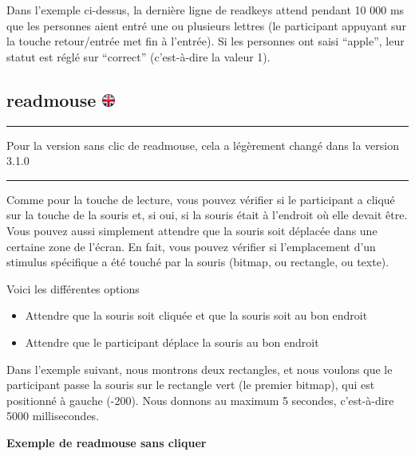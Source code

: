 \documentclass[
]{book}
\providecommand{\tightlist}{%
  \setlength{\itemsep}{0pt}\setlength{\parskip}{0pt}}
\begin{document}
Dans l'exemple ci-dessus, la dernière ligne de readkeys attend pendant
10 000 ms que les personnes aient entré une ou plusieurs lettres (le
participant appuyant sur la touche retour/entrée met fin à l'entrée). Si
les personnes ont saisi ``apple'', leur statut est réglé sur ``correct''
(c'est-à-dire la valeur 1).

\hypertarget{readmouse}{%
\subsection[readmouse ]{\texorpdfstring{readmouse
\href{https://www.psytoolkit.org/doc3.2.0/syntax.html\#task-readmouse}{\protect\includegraphics{img/ukflag.png}}}{readmouse }}\label{readmouse}}

\begin{center}\rule{0.5\linewidth}{\linethickness}\end{center}

Pour la version sans clic de readmouse, cela a légèrement changé dans la
version 3.1.0

\begin{center}\rule{0.5\linewidth}{\linethickness}\end{center}

Comme pour la touche de lecture, vous pouvez vérifier si le participant
a cliqué sur la touche de la souris et, si oui, si la souris était à
l'endroit où elle devait être. Vous pouvez aussi simplement attendre que
la souris soit déplacée dans une certaine zone de l'écran. En fait, vous
pouvez vérifier si l'emplacement d'un stimulus spécifique a été touché
par la souris (bitmap, ou rectangle, ou texte).

Voici les différentes options

\begin{itemize}
\tightlist
\item
  Attendre que la souris soit cliquée et que la souris soit au bon
  endroit
\item
  Attendre que le participant déplace la souris au bon endroit
\end{itemize}

Dans l'exemple suivant, nous montrons deux rectangles, et nous voulons
que le participant passe la souris sur le rectangle vert (le premier
bitmap), qui est positionné à gauche (-200). Nous donnons au maximum 5
secondes, c'est-à-dire 5000 millisecondes.

\textbf{Exemple de readmouse sans cliquer}
\end{document}
